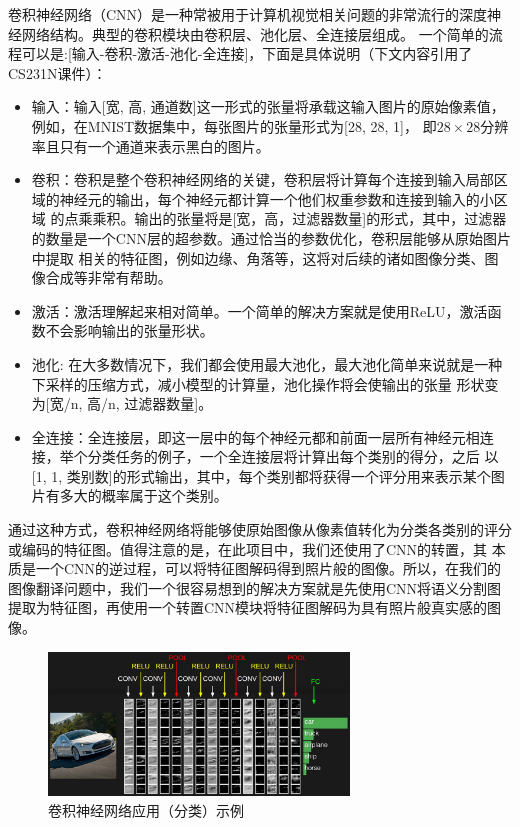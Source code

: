 \documentclass[supercite]{HustGraduPaper}
\theoremstyle{definition}
\begin{document}
卷积神经网络（CNN）是一种常被用于计算机视觉相关问题的非常流行的深度神经网络结构。典型的卷积模块由卷积层、池化层、全连接层组成。
一个简单的流程可以是:[输入-卷积-激活-池化-全连接]，下面是具体说明（下文内容引用了CS231N课件\cite{cs231n}）：
\begin{itemize}
  \item 输入：输入[宽, 高, 通道数]这一形式的张量将承载这输入图片的原始像素值，例如，在MNIST数据集中，每张图片的张量形式为[28, 28, 1]，
  即$28\times28$分辨率且只有一个通道来表示黑白的图片。
  \item 卷积：卷积是整个卷积神经网络的关键，卷积层将计算每个连接到输入局部区域的神经元的输出，每个神经元都计算一个他们权重参数和连接到输入的小区域
  的点乘乘积。输出的张量将是[宽，高，过滤器数量]的形式，其中，过滤器的数量是一个CNN层的超参数。通过恰当的参数优化，卷积层能够从原始图片中提取
  相关的特征图，例如边缘、角落等，这将对后续的诸如图像分类、图像合成等非常有帮助。
  \item 激活：激活理解起来相对简单。一个简单的解决方案就是使用ReLU，激活函数不会影响输出的张量形状。
  \item 池化: 在大多数情况下，我们都会使用最大池化，最大池化简单来说就是一种下采样的压缩方式，减小模型的计算量，池化操作将会使输出的张量
  形状变为[宽/n, 高/n, 过滤器数量]。
  \item 全连接：全连接层，即这一层中的每个神经元都和前面一层所有神经元相连接，举个分类任务的例子，一个全连接层将计算出每个类别的得分，之后
  以[1, 1, 类别数]的形式输出，其中，每个类别都将获得一个评分用来表示某个图片有多大的概率属于这个类别。
\end{itemize}

通过这种方式，卷积神经网络将能够使原始图像从像素值转化为分类各类别的评分或编码的特征图。值得注意的是，在此项目中，我们还使用了CNN的转置，其
本质是一个CNN的逆过程，可以将特征图解码得到照片般的图像。所以，在我们的图像翻译问题中，我们一个很容易想到的解决方案就是先使用CNN将语义分割图
提取为特征图，再使用一个转置CNN模块将特征图解码为具有照片般真实感的图像。
\begin{figure}[H]
  \begin{center}
  \includegraphics[width=8cm]{images/convnet}
  \end{center}
  \caption{卷积神经网络应用（分类）示例}
  \label{fig:CNN}
\end{figure}
\end{document}
